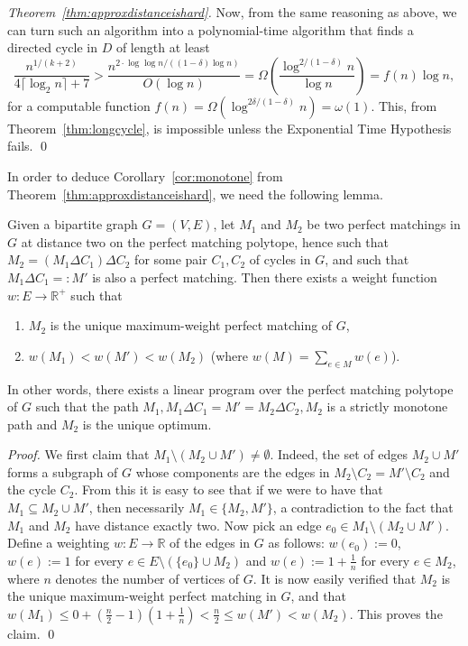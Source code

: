 \documentclass[runningheads]{llncs}
\begin{document}
\begin{proof}[Theorem~\ref{thm:approxdistanceishard}]
  Now, from the same reasoning as above, we can turn such an algorithm into a polynomial-time algorithm that finds a directed cycle in $D$ of length at least
  $$
  \frac{n^{1/(k+2)}}{4\lceil\log_2 n\rceil+7} > \frac{n^{2 \cdot \log \log n/((1-\delta)\log n)}}{O(\log n)} = \Omega\left(\frac{\log^{2/(1-\delta)}n}{\log n}\right)= f(n)\log n,
  $$
  for a computable function $f(n) = \Omega(\log^{2\delta/(1-\delta)} n)=\omega(1)$.
  This, from Theorem~\ref{thm:longcycle}, is impossible unless the Exponential Time Hypothesis fails.
  \qed\end{proof}

  In order to deduce Corollary~\ref{cor:monotone} from Theorem~\ref{thm:approxdistanceishard}, we need the following lemma.
  
  \begin{lemma}
    \label{lem:monotone}
    Given a bipartite graph $G=(V,E)$, let $M_1$ and $M_2$ be two perfect matchings in $G$ at distance two on the perfect matching polytope, hence such that $M_2=(M_1\Delta C_1)\Delta C_2$ for some pair $C_1,C_2$ of cycles in $G$, and such that $M_1 \Delta C_1=:M'$ is also a perfect matching. Then there exists a weight function $w:E\to\mathbb{R}^+$ such that
    \begin{enumerate}
    \item $M_2$ is the unique maximum-weight perfect matching of $G$,
    \item $w(M_1)<w(M')<w(M_2)$ (where $w(M)=\sum_{e\in M}w(e)$).
    \end{enumerate}
  In other words, there exists a linear program over the perfect matching polytope of $G$ such that the path $M_1, M_1\Delta C_1=M'=M_2 \Delta C_2,M_2$ is a strictly monotone path and $M_2$ is the unique optimum.
  \end{lemma}
  \begin{proof}
    We first claim that $M_1 \setminus (M_2 \cup M')\neq \emptyset$. Indeed, the set of edges $M_2 \cup M'$ forms a subgraph of $G$ whose components are the edges in $M_2 \setminus C_2=M' \setminus C_2$ and the cycle $C_2$. From this it is easy to see that if we were to have that $M_1 \subseteq M_2 \cup M'$, then necessarily $M_1\in \{M_2, M'\}$, a contradiction to the fact that $M_1$ and $M_2$ have distance exactly two. Now pick an edge $e_0 \in M_1 \setminus (M_2 \cup M')$. Define a weighting $w:E\rightarrow \mathbb{R}$ of the edges in $G$ as follows: $w(e_0):=0$, $w(e):=1$ for every $e \in E\setminus (\{e_0\}\cup M_2)$ and $w(e):=1+\frac{1}{n}$ for every $e \in M_2$, where $n$ denotes the number of vertices of $G$. It is now easily verified that $M_2$ is the unique maximum-weight perfect matching in $G$, and that $w(M_1) \le 0+(\frac{n}{2}-1)(1+\frac{1}{n})<\frac{n}{2}\le w(M') < w(M_2)$. This proves the claim.  \qed
  \end{proof}
  
\end{document}
